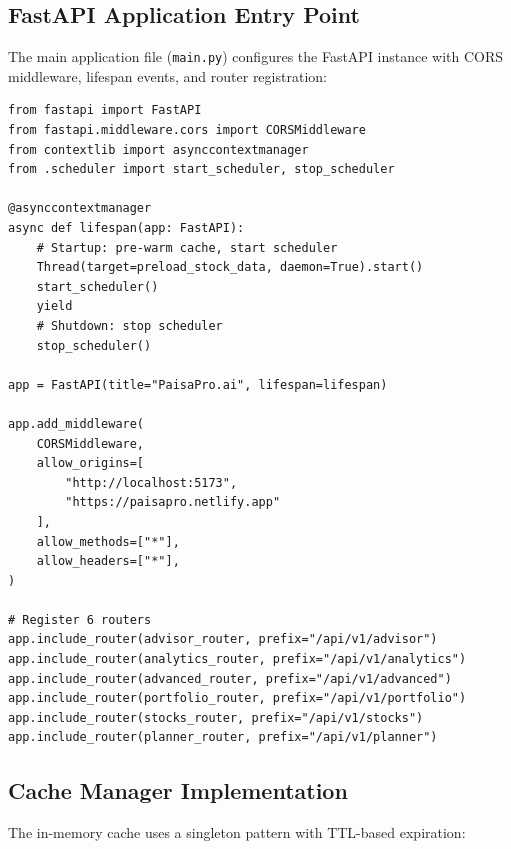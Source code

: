 \documentclass[12pt, a4paper, oneside]{report}
\begin{document}
\subsection{FastAPI Application Entry Point}

The main application file (\texttt{main.py}) configures the FastAPI instance with CORS middleware, lifespan events, and router registration:

\begin{lstlisting}[style=pythonstyle, caption={FastAPI application setup (simplified)}, label={lst:fastapi_main}]
from fastapi import FastAPI
from fastapi.middleware.cors import CORSMiddleware
from contextlib import asynccontextmanager
from .scheduler import start_scheduler, stop_scheduler

@asynccontextmanager
async def lifespan(app: FastAPI):
    # Startup: pre-warm cache, start scheduler
    Thread(target=preload_stock_data, daemon=True).start()
    start_scheduler()
    yield
    # Shutdown: stop scheduler
    stop_scheduler()

app = FastAPI(title="PaisaPro.ai", lifespan=lifespan)

app.add_middleware(
    CORSMiddleware,
    allow_origins=[
        "http://localhost:5173",
        "https://paisapro.netlify.app"
    ],
    allow_methods=["*"],
    allow_headers=["*"],
)

# Register 6 routers
app.include_router(advisor_router, prefix="/api/v1/advisor")
app.include_router(analytics_router, prefix="/api/v1/analytics")
app.include_router(advanced_router, prefix="/api/v1/advanced")
app.include_router(portfolio_router, prefix="/api/v1/portfolio")
app.include_router(stocks_router, prefix="/api/v1/stocks")
app.include_router(planner_router, prefix="/api/v1/planner")
\end{lstlisting}

\subsection{Cache Manager Implementation}

The in-memory cache uses a singleton pattern with TTL-based expiration:
\end{document}
